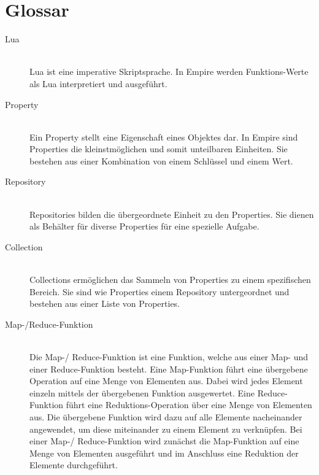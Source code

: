 
\section{Glossar}

\begin{description}
  \item[Lua] \hfill \\
  Lua ist eine imperative Skriptsprache. In Empire werden Funktions-Werte als Lua interpretiert und ausgeführt.
  \item[Property] \hfill \\
  Ein Property stellt eine Eigenschaft eines Objektes dar. In Empire sind Properties die kleinstmöglichen und somit unteilbaren Einheiten. Sie bestehen aus einer Kombination von einem Schlüssel und einem Wert.
  \item[Repository] \hfill \\
  Repositories bilden die übergeordnete Einheit zu den Properties. Sie dienen als Behälter für diverse Properties für eine spezielle Aufgabe.
  \item[Collection] \hfill \\
  Collections ermöglichen das Sammeln von Properties zu einem spezifischen Bereich. Sie sind wie Properties einem Repository untergeordnet und bestehen aus einer Liste von Properties.
  \item[Map-/Reduce-Funktion] \hfill \\
  Die Map-/ Reduce-Funktion ist eine Funktion, welche aus einer Map- und einer Reduce-Funktion besteht. Eine Map-Funktion führt eine übergebene Operation auf eine Menge von Elementen aus. Dabei wird jedes Element einzeln mittels der übergebenen Funktion ausgewertet. Eine Reduce-Funktion führt eine Reduktions-Operation über eine Menge von Elementen aus. Die übergebene Funktion wird dazu auf alle Elemente nacheinander angewendet, um diese miteinander zu einem Element zu verknüpfen. Bei einer Map-/ Reduce-Funktion wird zunächst die Map-Funktion auf eine Menge von Elementen ausgeführt und im Anschluss eine Reduktion der Elemente durchgeführt.
\end{description}
